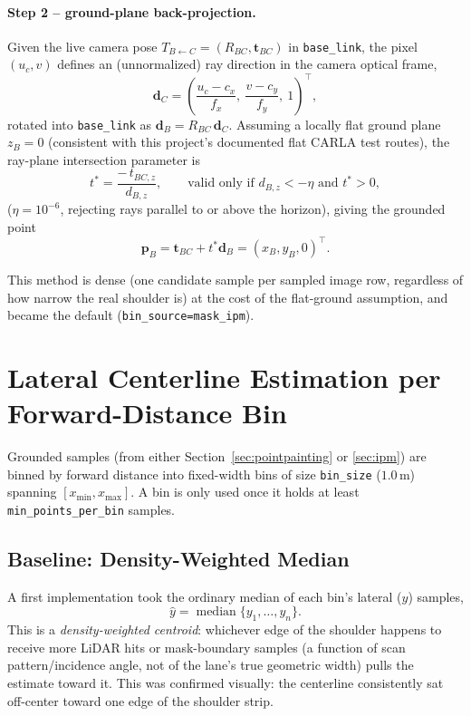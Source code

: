 \documentclass[11pt]{article}
\newcommand{\code}[1]{\texttt{#1}}
\begin{document}
\paragraph{Step 2 -- ground-plane back-projection.} Given the live camera pose
$T_{B \leftarrow C} = (R_{BC}, \mathbf{t}_{BC})$ in \code{base\_link}, the pixel $(u_c, v)$ defines
an (unnormalized) ray direction in the camera optical frame,
\begin{equation}
\mathbf{d}_C = \left( \frac{u_c - c_x}{f_x},\ \frac{v - c_y}{f_y},\ 1 \right)^\top,
\end{equation}
rotated into \code{base\_link} as $\mathbf{d}_B = R_{BC}\,\mathbf{d}_C$. Assuming a locally flat
ground plane $z_B = 0$ (consistent with this project's documented flat CARLA test routes), the
ray-plane intersection parameter is
\begin{equation}
t^\ast = \frac{-\,t_{BC,z}}{d_{B,z}}, \qquad \text{valid only if } d_{B,z} < -\eta \text{ and } t^\ast > 0,
\end{equation}
($\eta{=}10^{-6}$, rejecting rays parallel to or above the horizon), giving the grounded point
\begin{equation}
\mathbf{p}_B = \mathbf{t}_{BC} + t^\ast \mathbf{d}_B = (x_B, y_B, 0)^\top.
\end{equation}

This method is dense (one candidate sample per sampled image row, regardless of how narrow the
real shoulder is) at the cost of the flat-ground assumption, and became the default
(\code{bin\_source=mask\_ipm}).

\section{Lateral Centerline Estimation per Forward-Distance Bin}
\label{sec:estimator}

Grounded samples (from either Section~\ref{sec:pointpainting} or \ref{sec:ipm}) are binned by
forward distance into fixed-width bins of size \code{bin\_size} ($1.0\,\mathrm{m}$) spanning
$[x_{\min}, x_{\max}]$. A bin is only used once it holds at least \code{min\_points\_per\_bin}
samples.

\subsection{Baseline: Density-Weighted Median}
A first implementation took the ordinary median of each bin's lateral ($y$) samples,
\begin{equation}
\hat{y} = \operatorname{median}\{y_1,\dots,y_n\}.
\end{equation}
This is a \emph{density-weighted centroid}: whichever edge of the shoulder happens to receive more
LiDAR hits or mask-boundary samples (a function of scan pattern/incidence angle, not of the lane's
true geometric width) pulls the estimate toward it. This was confirmed visually: the centerline
consistently sat off-center toward one edge of the shoulder strip.
\end{document}
